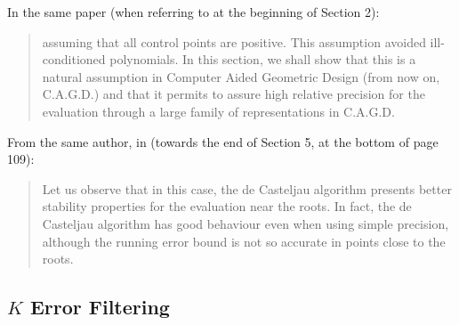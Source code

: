 \documentclass[letterpaper,10pt]{article}
\begin{document}
\noindent In the same paper (when referring to \cite{Bezerra2013} at the
beginning of Section 2):

\begin{quote}
  assuming that all control points are positive. This assumption avoided
  ill-conditioned polynomials. In this section, we shall show that this is
  a natural assumption in Computer Aided Geometric Design (from now on,
  C.A.G.D.) and that it permits to assure high relative precision for the
  evaluation through a large family of representations in C.A.G.D.
\end{quote}

\noindent From the same author, in \cite{Mainar2005} (towards the
end of Section 5, at the bottom of page 109):

\begin{quote}
  Let us observe that in this case, the de Casteljau algorithm presents
  better stability properties for the evaluation near the roots. In fact,
  the de Casteljau algorithm has good behaviour even when using simple
  precision, although the running error bound is not so accurate in points
  close to the roots.
\end{quote}

\subsection{\texorpdfstring{\(K\)}{K} Error Filtering}
\end{document}
